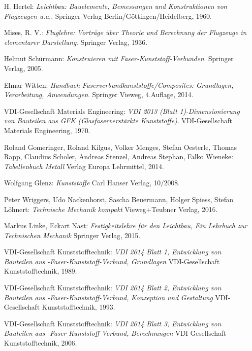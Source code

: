 \begin{thebibliography}{99}          
	H. Hertel:
	\textit {Leichtbau: Bauelemente, Bemessungen und Konstruktionen von Flugzeugen u.a.}.
	Springer Verlag Berlin/Göttingen/Heidelberg, 1960.
	
	Mises, R. V.:
	\textit {Fluglehre: Vorträge über Theorie und Berechnung der Flugzeuge in elementarer Darstellung}.
	Springer Verlag, 1936.
	
	Helmut Schürmann:
	\textit {Konstruieren mit Faser-Kunststoff-Verbunden}.
	Springer Verlag, 2005.
	
	Elmar Witten:
	\textit {Handbuch Faserverbundkunststoffe/Composites: Grundlagen, Verarbeitung, Anwendungen}.
	Springer Vieweg, 4.Auflage, 2014.
	
	VDI-Gesellschaft Materials Engineering:
	\textit{VDI 2013 (Blatt 1)-Dimensionierung von Bauteilen aus GFK (Glasfaserverstärkte Kunststoffe)}.
	VDI-Gesellschaft Materials Engineering, 1970.
	
	Roland Gomeringer, Roland Kilgus, Volker Menges, Stefan Oesterle, Thomas Rapp, Claudius Scholer, Andreas Stenzel, Andreas Stephan, Falko Wieneke:
	\textit{Tabellenbuch Metall}
	Verlag Europa Lehrmittel, 2014.
	
	Wolfgang Glenz:
	\textit{Kunststoffe}
	Carl Hanser Verlag, 10/2008.
	
	Peter Wriggers, Udo Nackenhorst, Sascha Beuermann, Holger Spiess, Stefan Löhnert:
	\textit{Technische Mechanik kompakt}
	Vieweg+Teubner Verlag, 2016.

	Markus Linke, Eckart Nast:
	\textit{Festigkeitslehre für den Leichtbau, Ein Lehrbuch zur Technischen Mechanik}
	Springer Verlag, 2015.

	
	VDI-Gesellschaft Kunststofftechnik:
	\textit{VDI 2014 Blatt 1, Entwicklung von Bauteilen aus -Faser-Kunststoff-Verbund, Grundlagen}
	VDI-Gesellschaft Kunststofftechnik, 1989.

	VDI-Gesellschaft Kunststofftechnik:
	\textit{VDI 2014 Blatt 2, Entwicklung von Bauteilen aus -Faser-Kunststoff-Verbund, Konzeption und Gestaltung}
	VDI-Gesellschaft Kunststofftechnik, 1993.
	
	VDI-Gesellschaft Kunststofftechnik:
	\textit{VDI 2014 Blatt 3, Entwicklung von Bauteilen aus -Faser-Kunststoff-Verbund, Berechnungen}
	VDI-Gesellschaft Kunststofftechnik, 2006.
		

\end{thebibliography}
